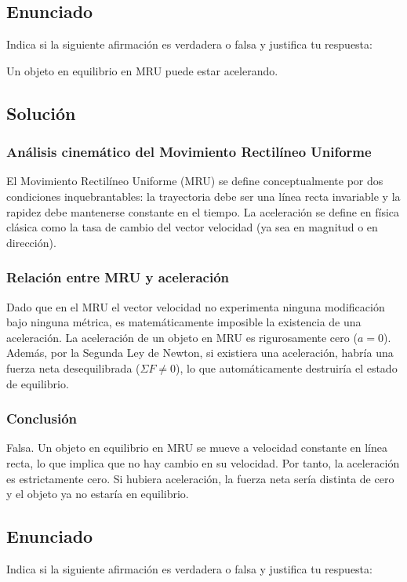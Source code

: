 \documentclass[12pt, a4paper]{article}
\begin{document}
\newpage

\subsection*{Enunciado}
Indica si la siguiente afirmación es verdadera o falsa y justifica tu respuesta: 

Un objeto en equilibrio en MRU puede estar acelerando.

\subsection*{Solución}

\subsubsection*{Análisis cinemático del Movimiento Rectilíneo Uniforme}
El Movimiento Rectilíneo Uniforme (MRU) se define conceptualmente por dos condiciones inquebrantables: la trayectoria debe ser una línea recta invariable y la rapidez debe mantenerse constante en el tiempo. La aceleración se define en física clásica como la tasa de cambio del vector velocidad (ya sea en magnitud o en dirección). 

\subsubsection*{Relación entre MRU y aceleración}
Dado que en el MRU el vector velocidad no experimenta ninguna modificación bajo ninguna métrica, es matemáticamente imposible la existencia de una aceleración. La aceleración de un objeto en MRU es rigurosamente cero ($a = 0$). Además, por la Segunda Ley de Newton, si existiera una aceleración, habría una fuerza neta desequilibrada ($\Sigma F \neq 0$), lo que automáticamente destruiría el estado de equilibrio.

\subsubsection*{Conclusión}
Falsa. Un objeto en equilibrio en MRU se mueve a velocidad constante en línea recta, lo que implica que no hay cambio en su velocidad. Por tanto, la aceleración es estrictamente cero. Si hubiera aceleración, la fuerza neta sería distinta de cero y el objeto ya no estaría en equilibrio.

\newpage
\subsection*{Enunciado}
Indica si la siguiente afirmación es verdadera o falsa y justifica tu respuesta: 
\end{document}
